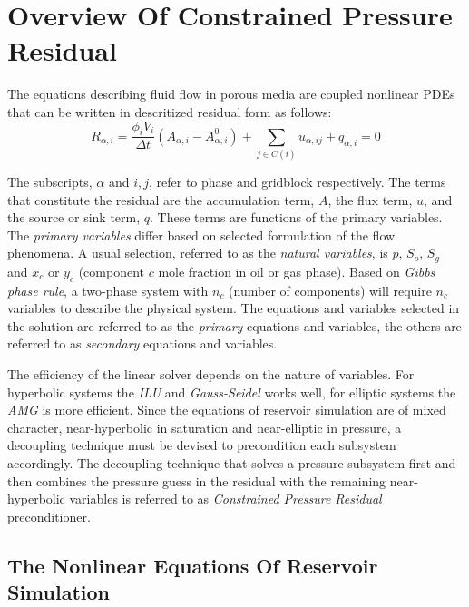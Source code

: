 \chapter{Overview Of Constrained Pressure Residual}

The equations describing fluid flow in porous media are coupled nonlinear PDEs that can be written in descritized
residual form as follows\supercite{opmflow}:
\begin{equation}
	R_{\alpha,i} = \frac{\phi_{i}V_{i}}{\Delta t} (A_{\alpha,i} - A^{0}_{\alpha,i}) + \sum_{j\in C(i)} u_{\alpha,ij} + q_{\alpha,i} = 0
	\label{res_bal}
\end{equation}

The subscripts, $\alpha$ and $i, j$, refer to phase and gridblock respectively. The terms that 
constitute the residual are the accumulation term, $A$, the flux term, $u$, and the source or sink term,
$q$. These terms are functions of the primary variables. The \textit{primary variables} differ based on 
selected formulation of the flow phenomena. A usual selection, referred to as the \textit{natural variables}, is
$p$, $S_{o}$, $S_{g}$ and $x_{c}$ or $y_{c}$ (component $c$ mole fraction in oil or gas phase). Based on \textit{Gibbs phase rule}, 
a two-phase system with $n_{c}$ (number of components) will require $n_{c}$ variables to describe the physical system\supercite{cao}. The equations and variables selected
in the solution are referred to as the \textit{primary} equations and variables, the others are referred to as \textit{secondary} equations and variables. 

The efficiency of the linear solver depends on the nature of variables. For hyperbolic systems the \textit{ILU} and \textit{Gauss-Seidel} works well, for
elliptic systems the \textit{AMG} is more efficient. Since the equations of reservoir simulation are of mixed character, near-hyperbolic in saturation and
near-elliptic in pressure, a decoupling technique must be devised to precondition each subsystem accordingly. The decoupling technique that solves a pressure
subsystem first and then combines the pressure guess in the residual with the remaining near-hyperbolic variables is referred to as \textit{Constrained Pressure Residual} preconditioner.

\section{The Nonlinear Equations Of Reservoir Simulation}

